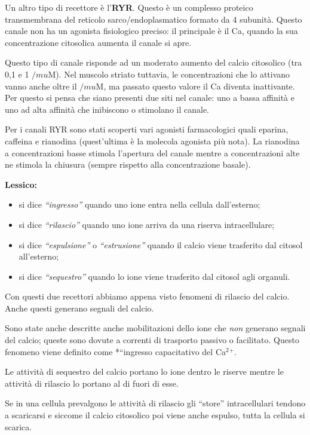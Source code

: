 \documentclass[]{article}
\begin{document}
Un altro tipo di recettore è l'\textbf{RYR}. Questo è un complesso
proteico transmembrana del reticolo sarco/endoplasmatico formato da 4
subunità. Questo canale non ha un agonista fisiologico preciso: il
principale è il Ca, quando la sua concentrazione citosolica aumenta il
canale si apre.

Questo tipo di canale risponde ad un moderato aumento del calcio
citosolico (tra 0,1 e 1 \(/mu\)M). Nel muscolo striato tuttavia, le
concentrazioni che lo attivano vanno anche oltre il \(/mu\)M, ma passato
questo valore il Ca diventa inattivante. Per questo si pensa che siano
presenti due siti nel canale: uno a bassa affinità e uno ad alta
affinità che inibiscono o stimolano il canale.

Per i canali RYR sono stati scoperti vari agonisti farmacologici quali
eparina, caffeina e rianodina (quest'ultima è la molecola agonista più
nota). La rianodina a concentrazioni basse stimola l'apertura del canale
mentre a concentrazioni alte ne stimola la chiusura (sempre rispetto
alla concentrazione basale).

\textbf{Lessico:}

\begin{itemize}
\itemsep1pt\parskip0pt
\item
  si dice \emph{``ingresso''} quando uno ione entra nella cellula
  dall'esterno;
\item
  si dice \emph{``rilascio''} quando uno ione arriva da una riserva
  intracellulare;
\item
  si dice \emph{``espulsione''} o \emph{``estrusione''} quando il calcio
  viene trasferito dal citosol all'esterno;
\item
  si dice \emph{``sequestro''} quando lo ione viene trasferito dal
  citosol agli organuli.
\end{itemize}

Con questi due recettori abbiamo appena visto fenomeni di rilascio del
calcio. Anche questi generano segnali del calcio.

Sono state anche descritte anche mobilitazioni dello ione che \emph{non}
generano segnali del calcio; queste sono dovute a correnti di trasporto
passivo o facilitato. Questo fenomeno viene definito come *``ingresso
capacitativo del Ca\(^2\)\(^+\).

Le attività di sequestro del calcio portano lo ione dentro le riserve
mentre le attività di rilascio lo portano al di fuori di esse.

Se in una cellula prevalgono le attività di rilascio gli ``store''
intracellulari tendono a scaricarsi e siccome il calcio citosolico poi
viene anche espulso, tutta la cellula si scarica.
\end{document}
